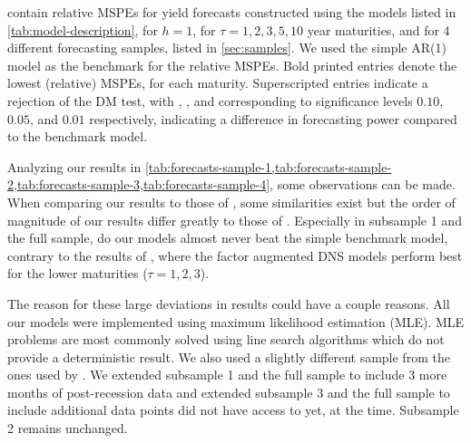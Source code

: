 contain relative MSPEs for yield forecasts constructed using the models listed in \cref{tab:model-description}, for $h = 1$, for $\tau = 1, 2, 3, 5, 10$ year maturities, and for 4 different forecasting samples, listed in \cref{sec:samples}. 
We used the simple AR(1) model as the benchmark for the relative MSPEs. 
Bold printed entries denote the lowest (relative) MSPEs, for each maturity. 
Superscripted entries indicate a rejection of the DM test, with \sym{*}, \sym{**}, and \sym{***} corresponding to significance levels $0.10$, $0.05$, and $0.01$ respectively, indicating a difference in forecasting power compared to the benchmark model. 

Analyzing our results in \cref{tab:forecasts-sample-1,tab:forecasts-sample-2,tab:forecasts-sample-3,tab:forecasts-sample-4}, some observations can be made. 
When comparing our results to those of \textcite{swanson_big_2017}, some similarities exist but the order of magnitude of our results differ greatly to those of \citeauthor{swanson_big_2017}. 
Especially in subsample 1 and the full sample, do our models almost never beat the simple benchmark model, contrary to the results of \citeauthor{swanson_big_2017}, where the factor augmented DNS models perform best for the lower maturities ($\tau = 1, 2, 3$).

The reason for these large deviations in results could have a couple reasons. All our models were implemented using maximum likelihood estimation (MLE). 
MLE problems are most commonly solved using line search algorithms which do not provide a deterministic result. 
We also used a slightly different sample from the ones used by \citeauthor{swanson_big_2017}. 
We extended subsample 1 and the full sample to include 3 more months of post-recession data and extended subsample 3 and the full sample to include additional data points \citeauthor{swanson_big_2017} did not have access to yet, at the time. 
Subsample 2 remains unchanged.

